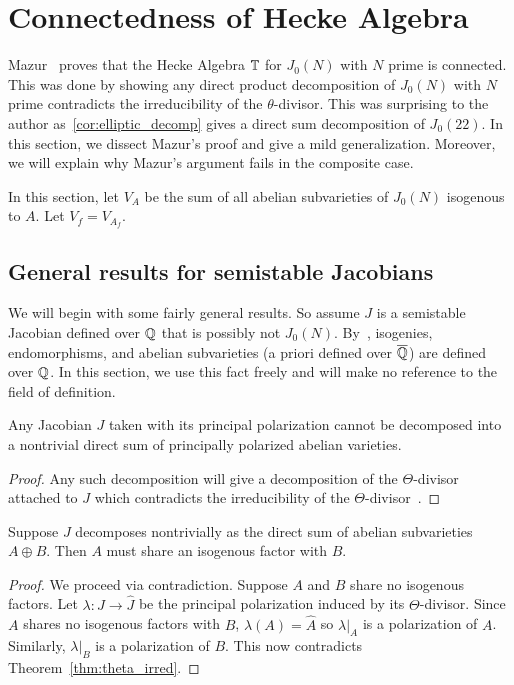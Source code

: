 \section{Connectedness of Hecke Algebra}%
\label{sec:connectedness_of_hecke_algebra}

Mazur~\cite[Prop. 10.6]{mazur:eisenstein} proves that the Hecke Algebra
$\mathbb{T}$ for $J_0(N)$ with $N$ prime is connected. This was done by showing any
direct product decomposition of $J_0(N)$ with $N$ prime contradicts the
irreducibility of the $\theta$-divisor. This was surprising to the author
as~\ref{cor:elliptic_decomp} gives a direct sum decomposition of $J_0(22)$. In
this section, we dissect Mazur's proof and give a mild generalization.
Moreover, we will explain why Mazur's argument fails in the composite case.

In this section, let $V_A$ be the sum of all abelian subvarieties of $J_0(N)$
isogenous to $A$. Let $V_f=V_{A_f}$.

\subsection{General results for semistable Jacobians}

We will begin with some fairly general results. So assume $J$ is a semistable
Jacobian defined over $\mathbb{Q}$ that is possibly not $J_0(N)$. By~\cite[Corollary
1.4]{ribet:endo}, isogenies, endomorphisms, and abelian subvarieties (a priori
defined over $\overline{\mathbb{Q}}$) are defined over $\mathbb{Q}$. In this section, we use this
fact freely and will make no reference to the field of definition.

\begin{theorem}
    \label{thm:theta_irred}
    Any Jacobian $J$ taken with its principal polarization cannot be decomposed
    into a nontrivial direct sum of principally polarized abelian varieties.
\end{theorem}
\begin{proof}
    Any such decomposition will give a decomposition of the $\Theta$-divisor
    attached to $J$ which contradicts the irreducibility of the
    $\Theta$-divisor~\cite[\S 4(a)]{kempf:riemann}.
\end{proof}

\begin{lemma}
    \label{lem:decomp_isogeny}
    Suppose $J$ decomposes nontrivially as the direct sum of abelian subvarieties
    $A\oplus B$. Then $A$ must share an isogenous factor with $B$.
\end{lemma}
\begin{proof}
    We proceed via contradiction. Suppose $A$ and $B$ share no isogenous
    factors. Let $\lambda:J\to \hat{J}$ be the principal polarization induced
    by its $\Theta$-divisor. Since $A$ shares no isogenous factors with $B$,
    $\lambda(A)=\hat{A}$ so $\lambda|_A$ is a polarization of $A$. Similarly,
    $\lambda|_B$ is a polarization of $B$. This now contradicts
    Theorem~\ref{thm:theta_irred}.
\end{proof}

